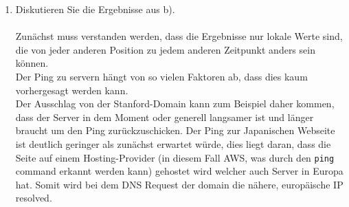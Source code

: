 \documentclass[a4paper]{article}
\begin{document}
\begin{enumerate}[label=\alph*)]
\begin{center}
\end{center}
    \item Diskutieren Sie die Ergebnisse aus b).\\\\
    Zunächst muss verstanden werden, dass die Ergebnisse nur lokale Werte sind, die von jeder anderen Position zu jedem anderen Zeitpunkt anders sein können.\\
    Der Ping zu servern hängt von so vielen Faktoren ab, dass dies kaum vorhergesagt werden kann.\\
    Der Ausschlag von der Stanford-Domain kann zum Beispiel daher kommen, dass der Server in dem Moment oder generell langsamer ist und länger braucht um den Ping zurückzuschicken. Der Ping zur Japanischen Webseite ist deutlich geringer als zunächst erwartet würde, dies liegt daran, dass die Seite auf einem Hosting-Provider (in diesem Fall AWS, was durch den \texttt{ping} command erkannt werden kann) gehostet wird welcher auch Server in Europa hat. Somit wird bei dem DNS Request der domain die nähere, europäische IP resolved.
\end{enumerate}
\end{document}
